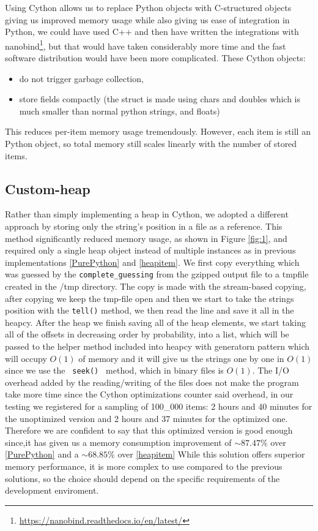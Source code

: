 \documentclass[english,noexaminfo,a4paper,oneside, binding = 0.6cm]{sapthesis}
\begin{document}
Using Cython allows us to replace Python objects with C-structured
objects giving us improved memory usage while also giving us ease of integration in Python, we could have used C++ and then have written the integrations with nanobind\footnote{\url{https://nanobind.readthedocs.io/en/latest/}}, but that would have taken considerably more time and the fast software distribution would have been more complicated.
These Cython objects:
\begin{itemize}
  \item do not trigger garbage collection,
  \item store fields compactly (the struct is made using chars and doubles which is much smaller than normal python strings, and floats)
\end{itemize}

This reduces per-item memory usage tremendously. However, each item is still
an Python object, so total memory still scales linearly with the number of stored items.
\subsection{Custom-heap}

\label{customheap}
Rather than simply implementing a heap in Cython, we adopted a different approach by storing only the string's position in a file as a reference. This method significantly reduced memory usage, as shown in Figure \ref{fig:1}, and required only a single heap object instead of multiple instances as in previous implementations \ref{PurePython} and \ref{heapitem}.
We first copy everything which was guessed by the \texttt{complete\_guessing} from the gzipped output file to a tmpfile created in the /tmp directory.
The copy is made with the stream-based copying, after copying we keep the tmp-file open and then we start to take the strings position with the \texttt{tell()} method, we then read the line and save it all in the heapcy.
After the heap we finish saving all of the heap elements, we start taking all of the offsets in decreasing order by probability, into a list, which will be passed to the helper 
method included into heapcy with generatorn pattern which will occupy $O(1)$ of memory
and it will give us the strings one by one in $O(1)$ since we use the \texttt{ seek() } method, which in binary files is $O(1)$.
The I/O overhead added by the reading/writing of the files does not make the program take more time since the Cython optimizations counter said overhead, in our testing we registered for a sampling of 100\_000 items: 
2 hours and 40 minutes for the unoptimized version and 2 hours and 37 minutes for the optimized one.
Therefore we are confident to say that this optimized version is good enough since,it has given us a memory consumption improvement of $\sim87.47\%$ over \ref{PurePython} and a $\sim68.85\%$ over \ref{heapitem}
While this solution offers superior memory performance, it is more complex to use compared to the previous solutions, so the choice should depend on the specific requirements of the development enviroment.
\end{document}
